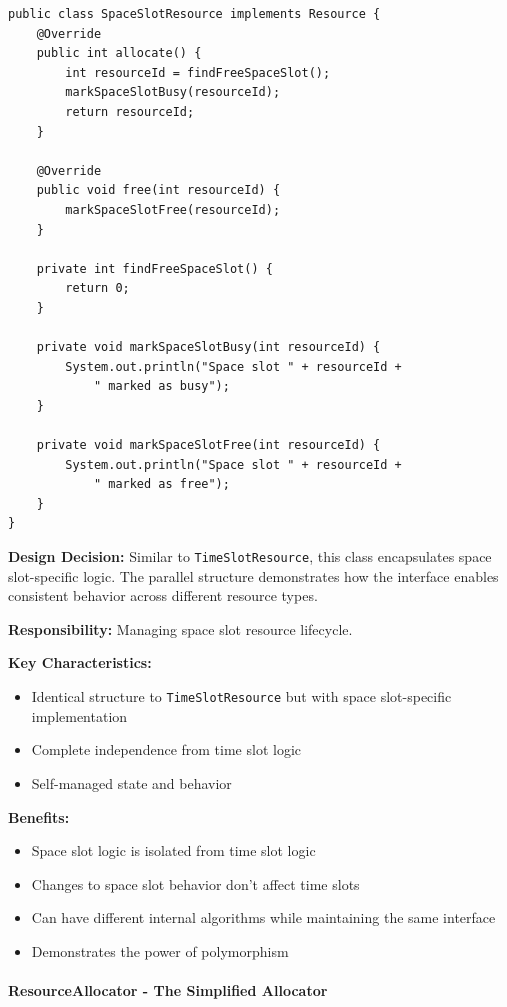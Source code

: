 \begin{verbatim}
public class SpaceSlotResource implements Resource {
    @Override
    public int allocate() {
        int resourceId = findFreeSpaceSlot();
        markSpaceSlotBusy(resourceId);
        return resourceId;
    }
    
    @Override
    public void free(int resourceId) {
        markSpaceSlotFree(resourceId);
    }
    
    private int findFreeSpaceSlot() {
        return 0;
    }
    
    private void markSpaceSlotBusy(int resourceId) {
        System.out.println("Space slot " + resourceId + 
            " marked as busy");
    }
    
    private void markSpaceSlotFree(int resourceId) {
        System.out.println("Space slot " + resourceId + 
            " marked as free");
    }
}
\end{verbatim}

\textbf{Design Decision:} Similar to \texttt{TimeSlotResource}, this class encapsulates space slot-specific logic. The parallel structure demonstrates how the interface enables consistent behavior across different resource types.

\textbf{Responsibility:} Managing space slot resource lifecycle.

\textbf{Key Characteristics:}
\begin{itemize}
    \item Identical structure to \texttt{TimeSlotResource} but with space slot-specific implementation
    \item Complete independence from time slot logic
    \item Self-managed state and behavior
\end{itemize}

\textbf{Benefits:}
\begin{itemize}
    \item Space slot logic is isolated from time slot logic
    \item Changes to space slot behavior don't affect time slots
    \item Can have different internal algorithms while maintaining the same interface
    \item Demonstrates the power of polymorphism
\end{itemize}

\paragraph{ResourceAllocator - The Simplified Allocator}

